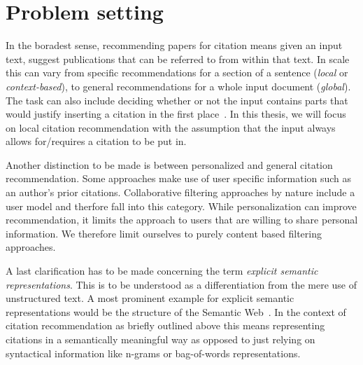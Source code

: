 


\section{Problem setting}\label{sec:problemsetting}
In the boradest sense, recommending papers for citation means given an input text, suggest publications that can be referred to from within that text. In scale this can vary from specific recommendations for a section of a sentence (\emph{local} or \emph{context-based}), to general recommendations for a whole input document (\emph{global}). The task can also include deciding whether or not the input contains parts that would justify inserting a citation in the first place~\cite{He2011}. In this thesis, we will focus on local citation recommendation with the assumption that the input always allows for/requires a citation to be put in.

Another distinction to be made is between personalized and general citation recommendation. Some approaches make use of user specific information such as an author's prior citations. Collaborative filtering approaches by nature include a user model and therfore fall into this category. While personalization can improve recommendation, it limits the approach to users that are willing to share personal information. %
We therefore limit ourselves to purely content based filtering approaches.

A last clarification has to be made concerning the term \emph{explicit semantic representations}. This is to be understood as a differentiation from the mere use of unstructured text. A most prominent example for explicit semantic representations would be the structure of the Semantic Web~\cite{Berners-Lee2001}. In the context of citation recommendation as briefly outlined above this means representing citations in a semantically meaningful way as opposed to just relying on syntactical information like n-grams or bag-of-words representations.

